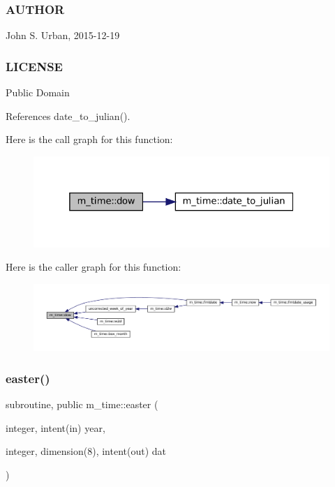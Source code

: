  \subsubsection*{A\+U\+T\+H\+OR}

John S. Urban, 2015-\/12-\/19 \subsubsection*{L\+I\+C\+E\+N\+SE}

Public Domain 

References date\+\_\+to\+\_\+julian().

Here is the call graph for this function\+:\nopagebreak
\begin{figure}[H]
\begin{center}
\leavevmode
\includegraphics[width=325pt]{namespacem__time_adfda8a89820b8d0ad4581a14896e4ce5_cgraph}
\end{center}
\end{figure}
Here is the caller graph for this function\+:\nopagebreak
\begin{figure}[H]
\begin{center}
\leavevmode
\includegraphics[width=350pt]{namespacem__time_adfda8a89820b8d0ad4581a14896e4ce5_icgraph}
\end{center}
\end{figure}
\mbox{\label{namespacem__time_a5ccb70e20160fcf26bb403dbff1f138a}} 
\subsubsection{\texorpdfstring{easter()}{easter()}}
{\footnotesize\ttfamily subroutine, public m\+\_\+time\+::easter (\begin{DoxyParamCaption}\item[{integer, intent(in)}]{year,  }\item[{integer, dimension(8), intent(out)}]{dat }\end{DoxyParamCaption})}



